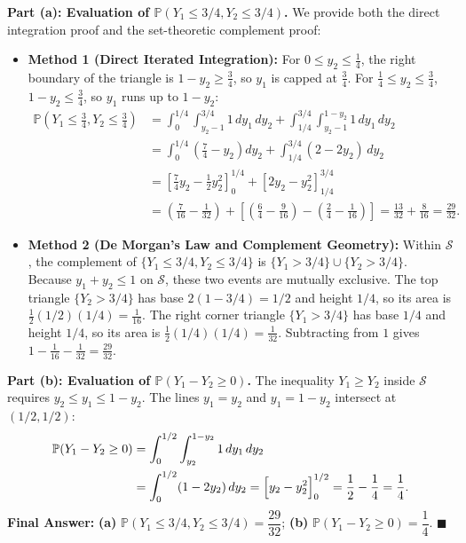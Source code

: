 \documentclass[11pt, letterpaper]{article}
\theoremstyle{definition}
\theoremstyle{remark}
\begin{document}
\textbf{Part (a): Evaluation of $\mathbb{P}(Y_1 \le 3/4, Y_2 \le 3/4)$.}
We provide both the direct integration proof and the set-theoretic complement proof:
\begin{itemize}
    \item \textbf{Method 1 (Direct Iterated Integration):} For $0 \le y_2 \le \frac{1}{4}$, the right boundary of the triangle is $1 - y_2 \ge \frac{3}{4}$, so $y_1$ is capped at $\frac{3}{4}$. For $\frac{1}{4} \le y_2 \le \frac{3}{4}$, $1 - y_2 \le \frac{3}{4}$, so $y_1$ runs up to $1 - y_2$:
    \begin{align*}
        \mathbb{P}\!\left(Y_1 \le \frac{3}{4}, Y_2 \le \frac{3}{4}\right) 
        &= \int_{0}^{1/4} \int_{y_2 - 1}^{3/4} 1 \, dy_1 \, dy_2 + \int_{1/4}^{3/4} \int_{y_2 - 1}^{1 - y_2} 1 \, dy_1 \, dy_2 \\
        &= \int_{0}^{1/4} \left( \frac{7}{4} - y_2 \right) dy_2 + \int_{1/4}^{3/4} (2 - 2y_2) \, dy_2 \\
        &= \left[ \frac{7}{4} y_2 - \frac{1}{2} y_2^2 \right]_{0}^{1/4} + \left[ 2y_2 - y_2^2 \right]_{1/4}^{3/4} \\
        &= \left( \frac{7}{16} - \frac{1}{32} \right) + \left[ \left( \frac{6}{4} - \frac{9}{16} \right) - \left( \frac{2}{4} - \frac{1}{16} \right) \right] = \frac{13}{32} + \frac{8}{16} = \frac{29}{32}.
    \end{align*}
    \item \textbf{Method 2 (De Morgan's Law and Complement Geometry):} Within $\mathcal{S}$, the complement of $\{Y_1 \le 3/4, Y_2 \le 3/4\}$ is $\{Y_1 > 3/4\} \cup \{Y_2 > 3/4\}$. Because $y_1 + y_2 \le 1$ on $\mathcal{S}$, these two events are mutually exclusive. The top triangle $\{Y_2 > 3/4\}$ has base $2(1 - 3/4) = 1/2$ and height $1/4$, so its area is $\frac{1}{2}(1/2)(1/4) = \frac{1}{16}$. The right corner triangle $\{Y_1 > 3/4\}$ has base $1/4$ and height $1/4$, so its area is $\frac{1}{2}(1/4)(1/4) = \frac{1}{32}$. Subtracting from $1$ gives $1 - \frac{1}{16} - \frac{1}{32} = \frac{29}{32}$.
\end{itemize}

\textbf{Part (b): Evaluation of $\mathbb{P}(Y_1 - Y_2 \ge 0)$.}
The inequality $Y_1 \ge Y_2$ inside $\mathcal{S}$ requires $y_2 \le y_1 \le 1 - y_2$. The lines $y_1 = y_2$ and $y_1 = 1 - y_2$ intersect at $(1/2, 1/2)$:
\begin{align*}
    \mathbb{P}(Y_1 - Y_2 \ge 0) &= \int_{0}^{1/2} \int_{y_2}^{1 - y_2} 1 \, dy_1 \, dy_2 \\
    &= \int_{0}^{1/2} (1 - 2y_2) \, dy_2 = \Bigl[ y_2 - y_2^2 \Bigr]_{0}^{1/2} = \frac{1}{2} - \frac{1}{4} = \frac{1}{4}.
\end{align*}
\textbf{Final Answer:} \textbf{(a)} $\mathbb{P}(Y_1 \le 3/4, Y_2 \le 3/4) = \dfrac{29}{32}$; \quad \textbf{(b)} $\mathbb{P}(Y_1 - Y_2 \ge 0) = \dfrac{1}{4}$. $\blacksquare$
\end{document}
